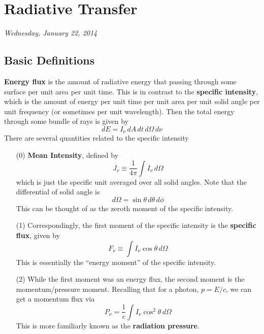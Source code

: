 \documentclass[10pt]{article}
\numberwithin{equation}{section}
\begin{document}
\section{Radiative Transfer} %
\label{sec:radiative_transfer}
\textit{Wednesday, January 22, 2014}
\subsection{Basic Definitions} %
\label{sub:basic_definitions}
\textbf{Energy flux} is the amount of radiative energy that passing through
some surface per unit area per unit time. This is in contrast to the
\textbf{specific intensity}, which is the amount of energy per unit time per
unit area per unit solid angle per unit frequency (or sometimes per unit
wavelength). Then the total energy through some bundle of rays is given by
\begin{equation}
  \label{eq:rt:1} dE = I_\nu\,dA\,dt\,d\Omega\,d\nu
\end{equation}
There are several quantities related to the specific intensity
\begin{enumerate}
  \item[(0)] \textbf{Mean Intensity}, defined by
  \begin{equation}
    \label{eq:rt:2} J_\nu \equiv \frac{1}{4\pi}\int I_\nu\,d\Omega
  \end{equation}
  which is just the specific unit averaged over all solid angles. Note that the
  differential of solid angle is
  \begin{equation}
    \label{eq:rt:3} d\Omega = \sin\theta\,d\theta\,d\phi
  \end{equation}
  This can be thought of as the zeroth moment of the specific intensity.
  \item[(1)] Correspondingly, the first moment of the specific intensity is the
  \textbf{specific flux}, given by
  \begin{equation}
    \label{eq:rt:4} F_\nu \equiv \int I_\nu \cos\theta\,d\Omega
  \end{equation}
  This is essentially the ``energy moment'' of the specific intensity.
  \item[(2)] While the first moment was an energy flux, the second moment is
  the momentum/pressure moment. Recalling that for a photon, $p = E/c$, we can
  get a momentum flux via
  \begin{equation}
    \label{eq:rt:5} P_\nu = \frac{1}{c}\int I_\nu \cos^2\theta\,d\Omega
  \end{equation}
  This is more familiarly known as the \textbf{radiation pressure}.
\end{enumerate}
\end{document}
